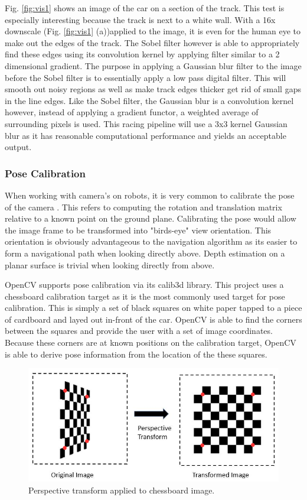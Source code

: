 \documentclass{article}
\begin{document}
Fig. \ref{fig:vis1} shows an image of the car on a section of the track. This test is especially interesting because the track is next to a white wall. With a 16x downscale (Fig. \ref{fig:vis1} (a))applied to the image, it is even for the human eye to make out the edges of the track. The Sobel filter however is able to appropriately find these edges using its convolution kernel by applying filter similar to a 2 dimensional gradient. The purpose in applying a Gaussian blur filter to the image before the Sobel filter is to essentially apply a low pass digital filter. This will smooth out noisy regions as well as make track edges thicker get rid of small gaps in the line edges. Like the Sobel filter, the Gaussian blur is a convolution kernel however, instead of applying a gradient functor, a weighted average of surrounding pixels is used. This racing pipeline will use a 3x3 kernel Gaussian blur as it has reasonable computational performance and yields an acceptable output.

\subsubsection{Pose Calibration}

When working with camera's on robots, it is very common to calibrate the pose of the camera \cite{b1} \cite{b3}. This refers to computing the rotation and translation matrix relative to a known point on the ground plane. Calibrating the pose would allow the image frame to be transformed into "birds-eye" view orientation. This orientation is obviously advantageous to the navigation algorithm as its easier to form a navigational path when looking directly above. Depth estimation on a planar surface is trivial when looking directly from above.

OpenCV supports pose calibration via its calib3d library. This project uses a chessboard calibration target as it is the most commonly used target for pose calibration. This is simply a set of black squares on white paper tapped to a piece of cardboard and layed out in-front of the car. OpenCV is able to find the corners between the squares and provide the user with a set of image coordinates. Because these corners are at known positions on the calibration target, OpenCV is able to derive pose information from the location of the these squares.

\begin{figure}[htb]
	\centering
	\centerline{\includegraphics[width=1.0\linewidth]{perspective_annotated}}
	\caption{Perspective transform applied to chessboard image.}
	\label{fig:perspective}
\end{figure}
\end{document}
